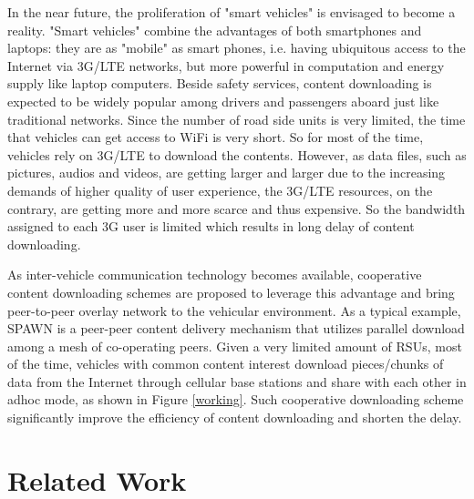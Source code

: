 \documentclass{acm_proc_article-sp}
\begin{document}
In the near future, the proliferation of "smart vehicles" is envisaged to become a reality. "Smart vehicles" combine the advantages of both smartphones and laptops: they are as "mobile" as smart phones, i.e. having ubiquitous access to the Internet via 3G/LTE networks, but more powerful in computation and energy supply like laptop computers. Beside safety services, content downloading is expected to be widely popular among drivers and passengers aboard just
like traditional networks. Since the number of road side units is very limited, the time that vehicles can get access to WiFi is very short. So for most of the time, vehicles rely on 3G/LTE to download the contents. However, as data files, such as pictures, audios and videos, are getting larger and larger due to the increasing demands of higher quality of user experience, the 3G/LTE resources, on the contrary, are getting more and more scarce and thus expensive. So the bandwidth assigned to each 3G user is limited which results in long delay of content downloading.

As inter-vehicle communication technology becomes available, cooperative content downloading schemes are proposed to leverage this advantage and bring peer-to-peer overlay network to the vehicular environment. As a typical example, SPAWN \cite{spawn} is a peer-peer content delivery mechanism that utilizes parallel download among a mesh of co-operating peers. Given a very limited amount of RSUs, most of the time, vehicles with common content interest download pieces/chunks of data from the Internet through cellular base stations and share with each other in adhoc mode, as shown in Figure \ref{working}. Such cooperative downloading scheme significantly improve the efficiency of content downloading and shorten the delay.

\section{Related Work}
\vspace{1 mm}
\end{document}
